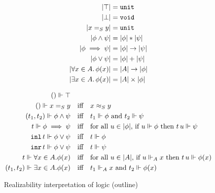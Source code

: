 \begin{figure*}
  \centering
  \parbox[t]{0.35\textwidth}{
    \begin{align*}
      |\top| &= \mathtt{unit} \\
      |\bot| &= \mathtt{void} \\
      |x =_S y| &= \mathtt{unit} \\
      |\phi \land \psi| &= |\phi| * |\psi| \\
      |\phi \implies \psi| &= |\phi| \to |\psi| \\
      |\phi \lor \psi| &= |\phi| + |\psi| \\
      |\forall x \in A .\, \phi(x)| &= |A| \to |\phi| \\
      |\exists x \in A .\, \phi(x)| &= |A| \times |\phi|
    \end{align*}
  }
  \vline
  \quad
  \parbox[t]{0.5\textwidth}{
    \begin{align*}
      () \Vdash \top &
      \\
      () \Vdash x =_S y
        &\quad\text{iff}\quad 
      x \approx_{S} y
      \\
      (t_1,t_2) \Vdash \phi \land \psi
        &\quad\text{iff}\quad
        \text{$t_1 \Vdash \phi$ and $t_2 \Vdash \psi$}
      \\
      t \Vdash \phi \implies \psi
        &\quad\text{iff}\quad
        \text{for all $u \in |\phi|$, if $u \Vdash \phi$ then $t\,u
          \Vdash \psi$}
      \\
      \texttt{inl}\,t \Vdash \phi \lor \psi
        &\quad\text{iff}\quad
        \text{$t \Vdash \phi$}
      \\
      \texttt{inr}\,t \Vdash \phi \lor \psi
        &\quad\text{iff}\quad
        \text{$t \Vdash \psi$}
      \\
      t \Vdash \forall x \in A . \phi(x)
        &\quad\text{iff}\quad
        \text{for all $u \in |A|$, if $u \Vdash_A x$ then $t\,u \Vdash \phi(x)$}
      \\
      (t_1, t_2) \Vdash \exists x \in A . \phi(x)
        &\quad\text{iff}\quad
        \text{$t_1 \Vdash_A x$ and $t_2 \Vdash \phi(x)$}
    \end{align*}
  }
  \caption{Realizability interpretation of logic (outline)}
  \label{fig:rz-logic}
\end{figure*}

